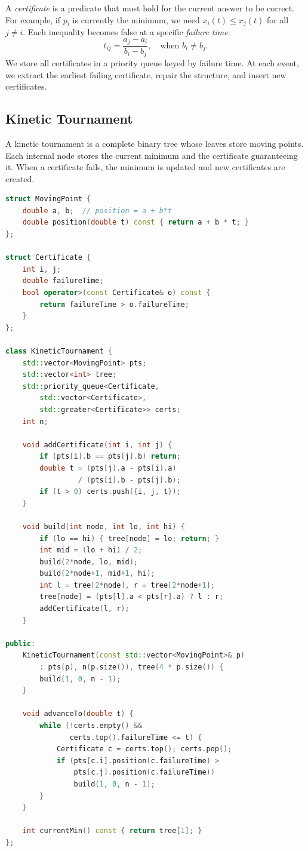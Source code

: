 A \emph{certificate} is a predicate that must hold for the current answer to be correct. For example, if $p_i$ is currently the minimum, we need $x_i(t) \leq x_j(t)$ for all $j \neq i$. Each inequality becomes false at a specific \emph{failure time}:
\[
  t_{ij} = \frac{a_j - a_i}{b_i - b_j}, \quad \text{when } b_i \neq b_j.
\]
We store all certificates in a priority queue keyed by failure time. At each event, we extract the earliest failing certificate, repair the structure, and insert new certificates.

\subsection{Kinetic Tournament}

A kinetic tournament is a complete binary tree whose leaves store moving points. Each internal node stores the current minimum and the certificate guaranteeing it. When a certificate fails, the minimum is updated and new certificates are created.

\begin{lstlisting}[language=C++]
struct MovingPoint {
    double a, b;  // position = a + b*t
    double position(double t) const { return a + b * t; }
};

struct Certificate {
    int i, j;
    double failureTime;
    bool operator>(const Certificate& o) const {
        return failureTime > o.failureTime;
    }
};

class KineticTournament {
    std::vector<MovingPoint> pts;
    std::vector<int> tree;
    std::priority_queue<Certificate,
        std::vector<Certificate>,
        std::greater<Certificate>> certs;
    int n;

    void addCertificate(int i, int j) {
        if (pts[i].b == pts[j].b) return;
        double t = (pts[j].a - pts[i].a)
                 / (pts[i].b - pts[j].b);
        if (t > 0) certs.push({i, j, t});
    }

    void build(int node, int lo, int hi) {
        if (lo == hi) { tree[node] = lo; return; }
        int mid = (lo + hi) / 2;
        build(2*node, lo, mid);
        build(2*node+1, mid+1, hi);
        int l = tree[2*node], r = tree[2*node+1];
        tree[node] = (pts[l].a < pts[r].a) ? l : r;
        addCertificate(l, r);
    }

public:
    KineticTournament(const std::vector<MovingPoint>& p)
        : pts(p), n(p.size()), tree(4 * p.size()) {
        build(1, 0, n - 1);
    }

    void advanceTo(double t) {
        while (!certs.empty() &&
               certs.top().failureTime <= t) {
            Certificate c = certs.top(); certs.pop();
            if (pts[c.i].position(c.failureTime) >
                pts[c.j].position(c.failureTime))
                build(1, 0, n - 1);
        }
    }

    int currentMin() const { return tree[1]; }
};
\end{lstlisting}


